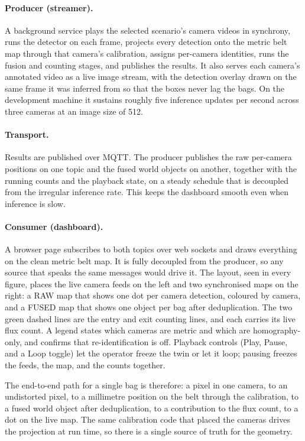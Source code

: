 \documentclass[11pt,a4paper]{article}
\begin{document}
\paragraph{Producer (streamer).}
A background service plays the selected scenario's camera videos in synchrony,
runs the detector on each frame, projects every detection onto the metric belt map
through that camera's calibration, assigns per-camera identities, runs the fusion
and counting stages, and publishes the results. It also serves each camera's
annotated video as a live image stream, with the detection overlay drawn on the
same frame it was inferred from so that the boxes never lag the bags. On the
development machine it sustains roughly five inference updates per second across
three cameras at an image size of 512.

\paragraph{Transport.}
Results are published over MQTT. The producer publishes the raw per-camera
positions on one topic and the fused world objects on another, together with the
running counts and the playback state, on a steady schedule that is decoupled from
the irregular inference rate. This keeps the dashboard smooth even when inference
is slow.

\paragraph{Consumer (dashboard).}
A browser page subscribes to both topics over web sockets and draws everything on
the clean metric belt map. It is fully decoupled from the producer, so any source
that speaks the same messages would drive it. The layout, seen in every figure,
places the live camera feeds on the left and two synchronised maps on the right:
a RAW map that shows one dot per camera detection, coloured by camera, and a FUSED
map that shows one object per bag after deduplication. The two green dashed lines
are the entry and exit counting lines, and each carries its live flux count. A
legend states which cameras are metric and which are homography-only, and confirms
that re-identification is off. Playback controls (Play, Pause, and a Loop toggle)
let the operator freeze the twin or let it loop; pausing freezes the feeds, the
map, and the counts together.

The end-to-end path for a single bag is therefore: a pixel in one camera, to an
undistorted pixel, to a millimetre position on the belt through the calibration,
to a fused world object after deduplication, to a contribution to the flux count,
to a dot on the live map. The same calibration code that placed the cameras drives
the projection at run time, so there is a single source of truth for the geometry.
\end{document}
